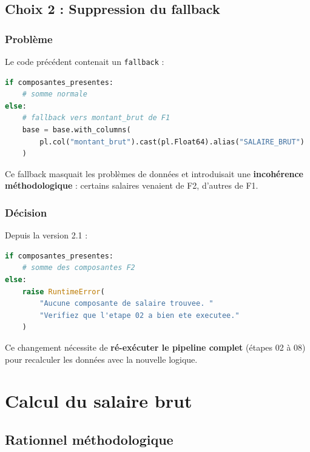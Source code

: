 \documentclass[12pt,a4paper,french]{article}
\begin{document}
\subsection{Choix 2 : Suppression du fallback}

\subsubsection{Problème}

Le code précédent contenait un \texttt{fallback} :

\begin{lstlisting}[language=Python]
if composantes_presentes:
    # somme normale
else:
    # fallback vers montant_brut de F1
    base = base.with_columns(
        pl.col("montant_brut").cast(pl.Float64).alias("SALAIRE_BRUT")
    )
\end{lstlisting}

Ce fallback masquait les problèmes de données et introduisait une
\textbf{incohérence méthodologique} : certains salaires venaient de F2,
d'autres de F1.

\subsubsection{Décision}

Depuis la version 2.1 :

\begin{lstlisting}[language=Python]
if composantes_presentes:
    # somme des composantes F2
else:
    raise RuntimeError(
        "Aucune composante de salaire trouvee. "
        "Verifiez que l'etape 02 a bien ete executee."
    )
\end{lstlisting}

\begin{warningbox}[Conséquence]
    Ce changement nécessite de \textbf{ré-exécuter le pipeline complet}
    (étapes 02 à 08) pour recalculer les données avec la nouvelle logique.
\end{warningbox}

\section{Calcul du salaire brut}

\subsection{Rationnel méthodologique}
\end{document}
